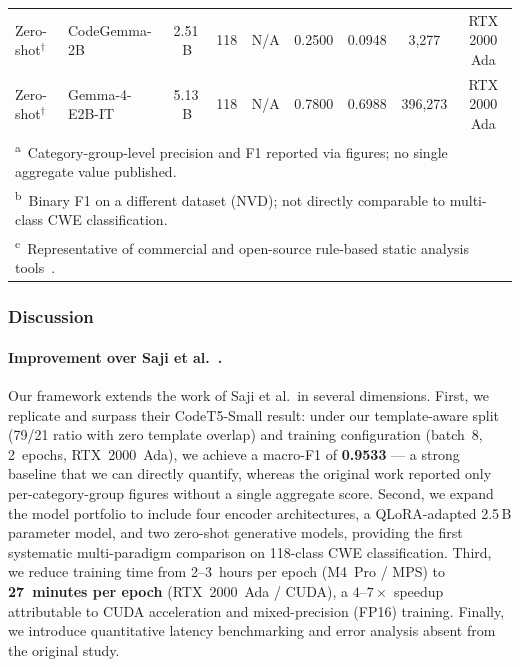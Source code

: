 \begin{table}[t]
\begin{tabular}{llccccccc}
Zero-shot$^{\dagger}$
    & CodeGemma-2B       & 2.51\,B & 118 & N/A
    & 0.2500 & 0.0948 & 3,277
    & RTX 2000 Ada \\
Zero-shot$^{\dagger}$
    & Gemma-4-E2B-IT     & 5.13\,B & 118 & N/A
    & 0.7800 & 0.6988 & 396,273
    & RTX 2000 Ada \\
\hline
\multicolumn{9}{l}{\footnotesize\textsuperscript{a}~Category-group-level precision and F1 reported via figures; no single aggregate value published.} \\
\multicolumn{9}{l}{\footnotesize\textsuperscript{b}~Binary F1 on a different dataset (NVD); not directly comparable to multi-class CWE classification.} \\
\multicolumn{9}{l}{\footnotesize\textsuperscript{c}~Representative of commercial and open-source rule-based static analysis tools~\cite{johnson2013why}.} \\
\end{tabular}
\end{table}

\subsubsection{Discussion}

\paragraph{Improvement over Saji et al.~\cite{saji2025efficient}.}
Our framework extends the work of Saji et al.\ in several dimensions.
First, we replicate and surpass their CodeT5-Small result: under our
template-aware split (79/21 ratio with zero template overlap) and
training configuration (batch~8, 2~epochs, RTX~2000~Ada), we achieve a
macro-F1 of \textbf{0.9533} --- a strong baseline that we can directly
quantify, whereas the original work reported only per-category-group
figures without a single aggregate score.  Second, we expand the model
portfolio to include four encoder architectures, a QLoRA-adapted 2.5\,B
parameter model, and two zero-shot generative models, providing the
first systematic multi-paradigm comparison on 118-class CWE
classification.  Third, we reduce training time from 2--3~hours per
epoch (M4~Pro / MPS) to \textbf{27~minutes per epoch} (RTX~2000~Ada /
CUDA), a $4$--$7\times$ speedup attributable to CUDA acceleration and
mixed-precision (FP16) training.  Finally, we introduce quantitative
latency benchmarking and error analysis absent from the original study.

